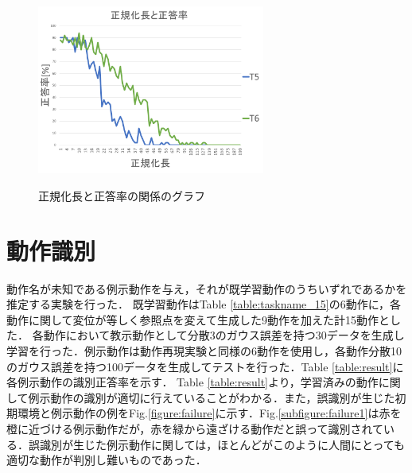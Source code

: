 \begin{figure}[h]
\begin{minipage}[t]{.49\textwidth}
		\label{subfigure:unit_c}
	\end{minipage}
	\begin{minipage}[t]{.49\textwidth}
		\centering
		\includegraphics[width=7.5cm]{chart11_d.png} \\ %
		\label{subfigure:unit_d}
	\end{minipage}
	\caption{正規化長と正答率の関係のグラフ}
	\label{figure:success_rate_for_UNIT}
\end{figure}


\section{動作識別}

動作名が未知である例示動作を与え，それが既学習動作のうちいずれであるかを推定する実験を行った．
既学習動作はTable \ref{table:taskname_15}の6動作に，各動作に関して変位が等しく参照点を変えて生成した9動作を加えた計15動作とした．
各動作において教示動作として分散3のガウス誤差を持つ30データを生成し学習を行った．例示動作は動作再現実験と同様の6動作を使用し，各動作分散10のガウス誤差を持つ100データを生成してテストを行った．Table \ref{table:result}に各例示動作の識別正答率を示す．
Table \ref{table:result}より，学習済みの動作に関して例示動作の識別が適切に行えていることがわかる．また，誤識別が生じた初期環境と例示動作の例をFig.\ref{figure:failure}に示す．Fig.\ref{subfigure:failure1}は赤を橙に近づける例示動作だが，赤を緑から遠ざける動作だと誤って識別されている．誤識別が生じた例示動作に関しては，ほとんどがこのように人間にとっても適切な動作が判別し難いものであった．

